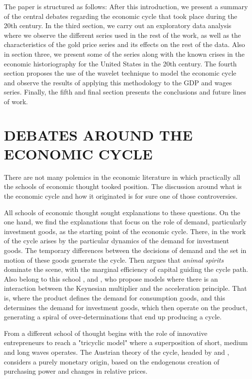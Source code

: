 \documentclass[a4paper,10cpi]{article}
\begin{document}
	The paper is structured as follows: After this introduction, we present a summary of the central debates regarding the economic cycle that took place during the 20th century. In the third section, we carry out an exploratory data analysis where we observe the different series used in the rest of the work, as well as the characteristics of the gold price series and its effects on the rest of the data. Also in section three, we present some of the series along with the known crises in the economic historiography for the United States in the 20th century. The fourth section proposes the use of the wavelet technique to model the economic cycle and observe the results of applying this methodology to the GDP and wages series. Finally, the fifth and final section presents the conclusions and future lines of work.
	
	
	\section{\uppercase{\textbf{\normalsize{Debates around the economic cycle}}}}
	
	There are not many polemics in the economic literature in which practically all the schools of economic thought tooked position. The discussion around what is the economic cycle and how it originated is for sure one of those controversies.
	
	All schools of economic thought sought explanations to these questions. On the one hand, we find the explanations that focus on the role of demand, particularly investment goods, as the starting point of the economic cycle. There, in the work of \cite{kalecki2013essays} the cycle arises by the particular dynamics of the demand for investment goods. The temporary differences between the decisions of demand and the set in motion of these goods generate the cycle. Then \cite{keynes2018general} argues that \textit{animal spirits} dominate the scene, with the marginal efficiency of capital guiding the cycle path. Also belong to this school \cite {harrod1936trade}, \cite{kaldor1940model} and \cite{samuelson1939synthesis}, who propose models where there is an interaction between the Keynesian multiplier and the acceleration principle. That is, where the product defines the demand for consumption goods, and this determines the demand for investment goods, which then operate on the product, generating a spiral of over-determinations that end up producing a cycle.
	
	From a different school of thought \cite{schumpeter1939business} begins with the role of innovative entrepreneurs to reach a "tricyclic model" where a superposition of short, medium and long waves operates.
	The Austrian theory of the cycle, headed by \cite{hayek1933} and \cite{von1943elastic}, considers a purely monetary origin, based on the endogenous creation of purchasing power and changes in relative prices.
	
\end{document}

